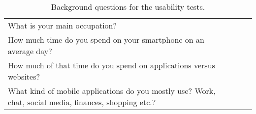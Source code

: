 \begin{table}[ht!]
    \centering
    \begin{tabularx}{0.9\textwidth} { 
        | >{\raggedright\arraybackslash}X 
        | >{\centering\arraybackslash}X 
        | >{\raggedleft\arraybackslash}X | }
        \hline
        What is your main occupation? \\
        How much time do you spend on your smartphone on an average day? \\
        How much of that time do you spend on applications versus websites? \\
        What kind of mobile applications do you mostly use? Work, chat, social media, finances,  shopping etc.?\\
        \hline
    \end{tabularx}
    \caption{\label{tab:background-questions} Background questions for the usability tests.}
\end{table}